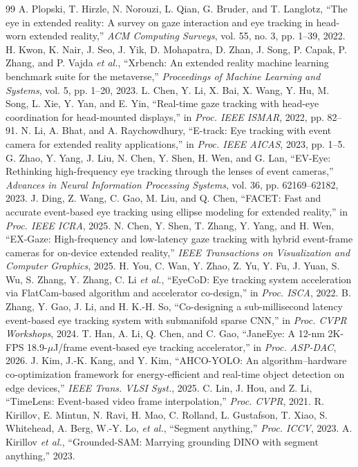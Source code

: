 \documentclass[journal]{IEEEtran}
\newcommand{\etal}{\textit{et al.}}
\begin{document}
\begin{thebibliography}{99}
\footnotesize
{} A. Plopski, T. Hirzle, N. Norouzi, L. Qian, G. Bruder, and T. Langlotz, ``The eye in extended reality: A survey on gaze interaction and eye tracking in head-worn extended reality,'' \emph{ACM Computing Surveys}, vol. 55, no. 3, pp. 1--39, 2022.
 H. Kwon, K. Nair, J. Seo, J. Yik, D. Mohapatra, D. Zhan, J. Song, P. Capak, P. Zhang, and P. Vajda \etal, ``Xrbench: An extended reality machine learning benchmark suite for the metaverse,'' \emph{Proceedings of Machine Learning and Systems}, vol. 5, pp. 1--20, 2023.
 L. Chen, Y. Li, X. Bai, X. Wang, Y. Hu, M. Song, L. Xie, Y. Yan, and E. Yin, ``Real-time gaze tracking with head-eye coordination for head-mounted displays,'' in \emph{Proc. IEEE ISMAR}, 2022, pp. 82--91.
 N. Li, A. Bhat, and A. Raychowdhury, ``E-track: Eye tracking with event camera for extended reality applications,'' in \emph{Proc. IEEE AICAS}, 2023, pp. 1--5.
 G. Zhao, Y. Yang, J. Liu, N. Chen, Y. Shen, H. Wen, and G. Lan, ``EV-Eye: Rethinking high-frequency eye tracking through the lenses of event cameras,'' \emph{Advances in Neural Information Processing Systems}, vol. 36, pp. 62169--62182, 2023.
 J. Ding, Z. Wang, C. Gao, M. Liu, and Q. Chen, ``FACET: Fast and accurate event-based eye tracking using ellipse modeling for extended reality,'' in \emph{Proc. IEEE ICRA}, 2025.
 N. Chen, Y. Shen, T. Zhang, Y. Yang, and H. Wen, ``EX-Gaze: High-frequency and low-latency gaze tracking with hybrid event-frame cameras for on-device extended reality,'' \emph{IEEE Transactions on Visualization and Computer Graphics}, 2025.
 H. You, C. Wan, Y. Zhao, Z. Yu, Y. Fu, J. Yuan, S. Wu, S. Zhang, Y. Zhang, C. Li \etal, ``EyeCoD: Eye tracking system acceleration via FlatCam-based algorithm and accelerator co-design,'' in \emph{Proc. ISCA}, 2022.
 B. Zhang, Y. Gao, J. Li, and H. K.-H. So, ``Co-designing a sub-millisecond latency event-based eye tracking system with submanifold sparse CNN,'' in \emph{Proc. CVPR Workshops}, 2024.
 T. Han, A. Li, Q. Chen, and C. Gao, ``JaneEye: A 12-nm 2K-FPS 18.9-$\mu$J/frame event-based eye tracking accelerator,'' in \emph{Proc. ASP-DAC}, 2026.
 J. Kim, J.-K. Kang, and Y. Kim, ``AHCO-YOLO: An algorithm--hardware co-optimization framework for energy-efficient and real-time object detection on edge devices,'' \emph{IEEE Trans. VLSI Syst.}, 2025.
 C. Lin, J. Hou, and Z. Li, ``TimeLens: Event-based video frame interpolation,'' \emph{Proc. CVPR}, 2021.
 R. Kirillov, E. Mintun, N. Ravi, H. Mao, C. Rolland, L. Gustafson, T. Xiao, S. Whitehead, A. Berg, W.-Y. Lo, \etal, ``Segment anything,'' \emph{Proc. ICCV}, 2023.
 A. Kirillov \etal, ``Grounded-SAM: Marrying grounding DINO with segment anything,'' 2023.
\end{thebibliography}
\end{document}
